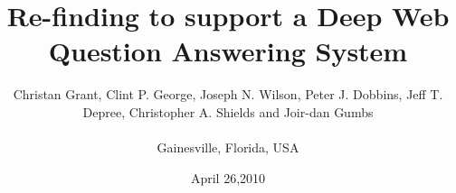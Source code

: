 \documentclass{www2010-submission}
\begin{document}
\title{Re-finding to support a Deep Web Question Answering System} 
\author{
	 \alignauthor Christan Grant, Clint P. George, Joseph N. Wilson, Peter J. Dobbins, Jeff T. Depree, Christopher A. Shields and Joir-dan Gumbs\\
	  \\ \affaddr
{ Gainesville, Florida, USA} \\
}
\date{April 26,2010}

\maketitle
















\end{document}
